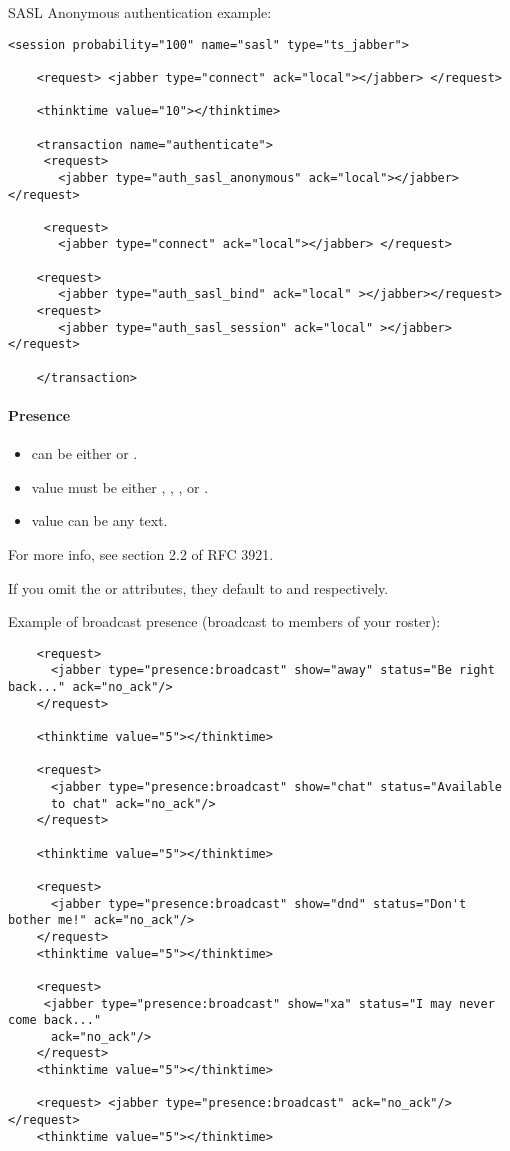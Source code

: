 \documentclass{TSUNG-en}
\begin{document}
SASL Anonymous authentication example:
\begin{Verbatim}
<session probability="100" name="sasl" type="ts_jabber">

    <request> <jabber type="connect" ack="local"></jabber> </request>

    <thinktime value="10"></thinktime>

    <transaction name="authenticate">
     <request>
       <jabber type="auth_sasl_anonymous" ack="local"></jabber></request>

     <request>
       <jabber type="connect" ack="local"></jabber> </request>

    <request>
       <jabber type="auth_sasl_bind" ack="local" ></jabber></request>
    <request>
       <jabber type="auth_sasl_session" ack="local" ></jabber></request>

    </transaction>
\end{Verbatim}


\paragraph{Presence}
\begin{itemize}
\item {} can be either  or .
\item {} value must be either , , , or .
\item {} value can be any text.
\end{itemize}
For more info, see section 2.2 of RFC 3921.

If you omit the  or  attributes, they default to  and  respectively.

Example of broadcast presence (broadcast to members of your roster):
\begin{Verbatim}
    <request>
      <jabber type="presence:broadcast" show="away" status="Be right back..." ack="no_ack"/>
    </request>

    <thinktime value="5"></thinktime>

    <request>
      <jabber type="presence:broadcast" show="chat" status="Available
      to chat" ack="no_ack"/>
    </request>

    <thinktime value="5"></thinktime>

    <request>
      <jabber type="presence:broadcast" show="dnd" status="Don't bother me!" ack="no_ack"/>
    </request>
    <thinktime value="5"></thinktime>

    <request>
     <jabber type="presence:broadcast" show="xa" status="I may never come back..."
      ack="no_ack"/>
    </request>
    <thinktime value="5"></thinktime>

    <request> <jabber type="presence:broadcast" ack="no_ack"/> </request>
    <thinktime value="5"></thinktime>
\end{Verbatim}
\end{document}
